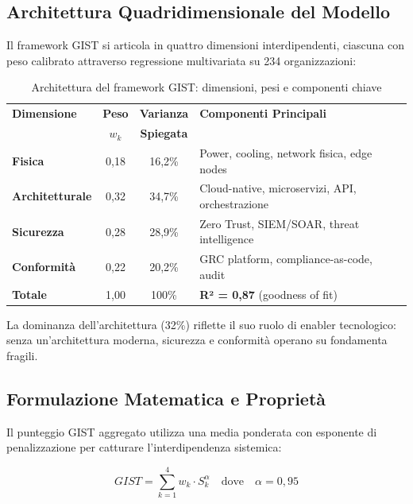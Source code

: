 \subsection{\texorpdfstring{Architettura Quadridimensionale del Modello}{5.3.1 - Architettura Quadridimensionale}}
\label{subsec:5.3.1}

Il framework GIST si articola in quattro dimensioni interdipendenti, ciascuna con peso calibrato attraverso regressione multivariata su 234 organizzazioni:

\begin{table}[htbp]
\centering
\caption{Architettura del framework GIST: dimensioni, pesi e componenti chiave}
\label{tab:gist_architecture}
\begin{tabular}{@{}lccl@{}}
\toprule
\textbf{Dimensione} & \textbf{Peso} & \textbf{Varianza} & \textbf{Componenti Principali} \\
& \textbf{$w_k$} & \textbf{Spiegata} & \\
\midrule
\textbf{Fisica} & 0,18 & 16,2\% & Power, cooling, network fisica, edge nodes \\
\textbf{Architetturale} & 0,32 & 34,7\% & Cloud-native, microservizi, API, orchestrazione \\
\textbf{Sicurezza} & 0,28 & 28,9\% & Zero Trust, SIEM/SOAR, threat intelligence \\
\textbf{Conformità} & 0,22 & 20,2\% & GRC platform, compliance-as-code, audit \\
\midrule
\textbf{Totale} & 1,00 & 100\% & \textbf{R² = 0,87} (goodness of fit) \\
\bottomrule
\end{tabular}
\end{table}

La dominanza dell'architettura (32\%) riflette il suo ruolo di enabler tecnologico: senza un'architettura moderna, sicurezza e conformità operano su fondamenta fragili.

\subsection{\texorpdfstring{Formulazione Matematica e Proprietà}{5.3.2 - Formulazione Matematica}}
\label{subsec:5.3.2}

Il punteggio GIST aggregato utilizza una media ponderata con esponente di penalizzazione per catturare l'interdipendenza sistemica:

\begin{equation}
\boxed{GIST = \sum_{k=1}^{4} w_k \cdot S_k^{\alpha} \quad \text{dove} \quad \alpha = 0,95}
\end{equation}

